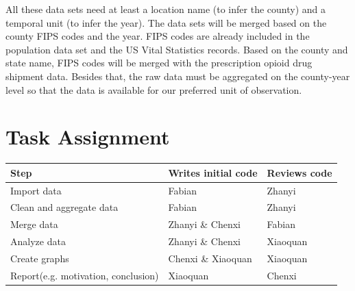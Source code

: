 \documentclass[12pt]{article}
\begin{document}
All these data sets need at least a location name (to infer the county) and a temporal unit (to infer the year). The data sets will be merged based on the county FIPS codes and the year. FIPS codes are already included in the population data set and the US Vital Statistics records. Based on the county and state name, FIPS codes will be merged with the prescription opioid drug shipment data. Besides that, the raw data must be aggregated on the county-year level so that the data is available for our preferred unit of observation.
\vspace*{1cm}


\section{Task Assignment}

\begin{center}
\begin{tabular}{ l | l l}
\textbf{Step}  & \textbf{Writes initial code} & \textbf{Reviews code}\\ \hline
 Import data & Fabian & Zhanyi\\  
 Clean and aggregate data & Fabian & Zhanyi\\
 Merge data & Zhanyi \& Chenxi & Fabian \\
 Analyze data & Zhanyi \& Chenxi & Xiaoquan \\
 Create graphs & Chenxi \&  Xiaoquan & Xiaoquan\\
 Report(e.g. motivation, conclusion) & Xiaoquan & Chenxi \\
\end{tabular}
\end{center}
\end{document}
